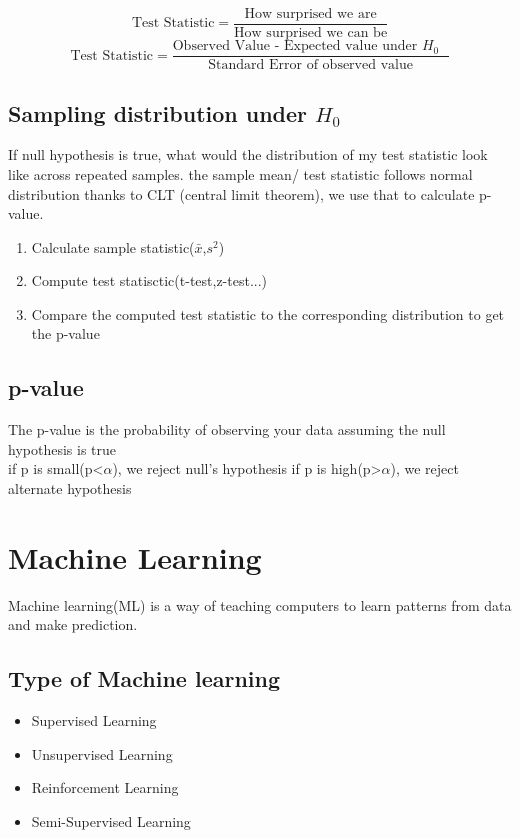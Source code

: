 \documentclass[12pt]{extarticle}
\begin{document}
$$ \text{Test Statistic} = \frac{\text{How surprised we are}}{\text{How surprised we can be}} $$
$$ \text{Test Statistic} =
\frac{\text{Observed Value - Expected value under $H_0$ }} {\text{Standard Error of observed value}} $$

\subsection{Sampling distribution under $H_0$}
If null hypothesis is true, what would the distribution of my test statistic look like 
across repeated samples. the sample mean/ test statistic follows normal distribution 
thanks to CLT (central limit theorem), we use that to calculate p-value.
\begin{enumerate}
    \item Calculate sample statistic($\bar{x}$,$s^2$)
    \item Compute test statisctic(t-test,z-test...)
    \item Compare the computed test statistic to the corresponding distribution
        to get the p-value
\end{enumerate}

\subsection{p-value}
The p-value is the probability of observing your data assuming the null
hypothesis is true \\
if p is small(p<$\alpha$), we reject null's hypothesis
if p is high(p>$\alpha$), we reject alternate hypothesis

\section{Machine Learning}
Machine learning(ML) is a way of teaching computers to learn patterns
from data and make prediction. 

\subsection{Type of Machine learning}
\begin{itemize}
    \item Supervised Learning
    \item Unsupervised Learning
    \item Reinforcement Learning
    \item Semi-Supervised Learning
\end{itemize}
\end{document}

